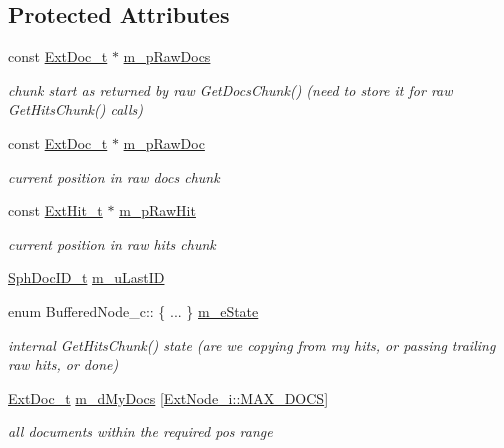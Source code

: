 \subsection*{Protected Attributes}
\begin{DoxyCompactItemize}
\item 
const \hyperlink{structExtDoc__t}{Ext\-Doc\-\_\-t} $\ast$ \hyperlink{classBufferedNode__c_a2a393307926ac4c2449e7946e5bf74b1}{m\-\_\-p\-Raw\-Docs}
\begin{DoxyCompactList}\small\item\em chunk start as returned by raw Get\-Docs\-Chunk() (need to store it for raw Get\-Hits\-Chunk() calls) \end{DoxyCompactList}\item 
const \hyperlink{structExtDoc__t}{Ext\-Doc\-\_\-t} $\ast$ \hyperlink{classBufferedNode__c_a2baee654bcd29bcaa8da922a239a81b6}{m\-\_\-p\-Raw\-Doc}
\begin{DoxyCompactList}\small\item\em current position in raw docs chunk \end{DoxyCompactList}\item 
const \hyperlink{structExtHit__t}{Ext\-Hit\-\_\-t} $\ast$ \hyperlink{classBufferedNode__c_a53f77e1199cfb9312c5f9e6263dd7b59}{m\-\_\-p\-Raw\-Hit}
\begin{DoxyCompactList}\small\item\em current position in raw hits chunk \end{DoxyCompactList}\item 
\hyperlink{sphinx_8h_a3176771631c12a9e4897272003e6b447}{Sph\-Doc\-I\-D\-\_\-t} \hyperlink{classBufferedNode__c_a84663ba9ff8f1319552c5bfe3b8a89f8}{m\-\_\-u\-Last\-I\-D}
\item 
enum Buffered\-Node\-\_\-c\-:: \{ ... \}  \hyperlink{classBufferedNode__c_a4d1a75942ed1b4c2e292910761b548b4}{m\-\_\-e\-State}
\begin{DoxyCompactList}\small\item\em internal Get\-Hits\-Chunk() state (are we copying from my hits, or passing trailing raw hits, or done) \end{DoxyCompactList}\item 
\hyperlink{structExtDoc__t}{Ext\-Doc\-\_\-t} \hyperlink{classBufferedNode__c_aea81fcd03e7cc64767006f41510d9496}{m\-\_\-d\-My\-Docs} \mbox{[}\hyperlink{classExtNode__i_afe46dd6ff6757d7a0bf3318fd1462bf9}{Ext\-Node\-\_\-i\-::\-M\-A\-X\-\_\-\-D\-O\-C\-S}\mbox{]}
\begin{DoxyCompactList}\small\item\em all documents within the required pos range \end{DoxyCompactList}\item 

\end{DoxyCompactItemize}
